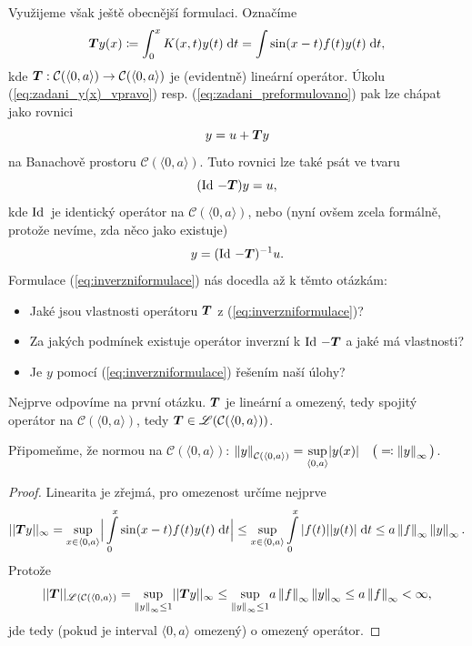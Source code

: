 Využijeme však ještě obecnější formulaci. Označíme
\begin{equation}
     \boldsymbol{T} y(x)\coloneqq \int_0^x K(x,t)y(t)\;\mathrm{d}t=\int\limits\sin(x-t)f(t)y(t)\;\mathrm{d}t,
    \label{eq:obesnejsiformulaceTy}
\end{equation}
kde $ \boldsymbol{T} : \mathcal{C}(\langle 0,a\rangle )\rightarrow \mathcal{C}(\langle 0,a\rangle )$ je (evidentně) lineární operátor. Úkolu (\ref{eq:zadani_y(x)_vpravo}) resp. (\ref{eq:zadani_preformulovano}) pak lze chápat jako rovnici
\begin{equation}
    y=u+ \boldsymbol{T} y
\end{equation}
na Banachově prostoru $\mathcal{C}(\langle 0,a\rangle)$. Tuto rovnici lze také psát ve tvaru
\begin{equation}
    (\operatorname{Id}\,- \boldsymbol{T} )y=u,
\end{equation}
kde $\operatorname{Id}\,$ je identický operátor na $\mathcal{C}(\langle 0,a\rangle)$, nebo (nyní ovšem zcela formálně, protože nevíme, zda něco jako  existuje)
\begin{equation}
    y = (\operatorname{Id}\,- \boldsymbol{T} )^{-1}u.
    \label{eq:inverzniformulace}
\end{equation}
Formulace (\ref{eq:inverzniformulace}) nás docedla až k těmto otázkám:
\begin{itemize}
    \item Jaké jsou vlastnosti operátoru $ \boldsymbol{T} $ z (\ref{eq:inverzniformulace})?
    \item Za jakých podmínek existuje operátor inverzní k $\operatorname{Id}\,- \boldsymbol{T} $ a jaké má vlastnosti?
    \item Je $y$  pomocí (\ref{eq:inverzniformulace}) řešením naší úlohy?
\end{itemize}
Nejprve odpovíme na první otázku. $ \boldsymbol{T} $ je lineární a omezený, tedy spojitý operátor na $\mathcal{C}(\langle0,a\rangle)$, tedy $ \boldsymbol{T} \in\mathscr{L}(\mathcal{C}(\langle0,a\rangle))$.

Připomeňme, že normou na $\mathcal{C}(\langle0,a\rangle)$: $\left\lVert y\right\rVert_{\mathcal{C}(\langle0,a\rangle)} = \underset{\langle 0,a\rangle}{\sup} |y(x)| \quad \big(\eqqcolon \left\lVert y\right\rVert_\infty\big)$.

\begin{proof}
Linearita je zřejmá, pro omezenost určíme nejprve
\begin{equation}
    || \boldsymbol{T} y||_\infty = \underset{x\in\langle0,a\rangle}{\sup}\Big|\int\limits_0^x\sin(x-t)f(t)y(t)\;\mathrm{d}t\Big|\leq \underset{x\in\langle0,a\rangle}{\sup}\int\limits_0^x|f(t)||y(t)|\;\mathrm{d}t\leq a\left\lVert f\right\rVert_\infty\left\lVert y\right\rVert_\infty.
\end{equation}
Protože  
\begin{equation}
    || \boldsymbol{T} ||_{\mathscr{L}(\mathcal{C}(\langle0,a\rangle)} = \underset{\left\lVert y\right\rVert_\infty\leq1}{\sup}|| \boldsymbol{T} y||_\infty\leq \underset{\left\lVert y\right\rVert_\infty\leq1}{\sup} a \left\lVert f\right\rVert_\infty \left\lVert y\right\rVert_\infty\leq a \left\lVert f\right\rVert_\infty<\infty,
    \label{eq:omezeniOperatoru}
\end{equation}
jde tedy (pokud je interval $\langle0,a\rangle$ omezený) o omezený operátor.
\end{proof}


